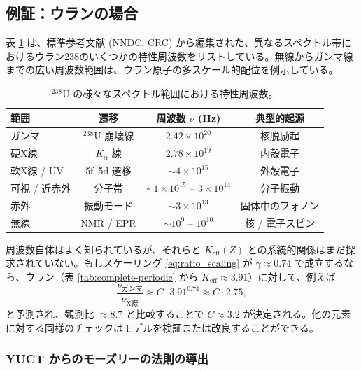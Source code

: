 \documentclass[11pt,a4paper]{article}
\begin{document}
	\subsection{例証：ウランの場合}
	
	表 \ref{tab:uranium_spectrum} は、標準参考文献 (NNDC, CRC) から編集された、異なるスペクトル帯におけるウラン238のいくつかの特性周波数をリストしている。無線からガンマ線までの広い周波数範囲は、ウラン原子の多スケール的配位を例示している。
	
	\begin{table}[htbp]
		\centering
		\caption{\(^{238}\mathrm{U}\) の様々なスペクトル範囲における特性周波数。}
		\label{tab:uranium_spectrum}
		\begin{tabular}{@{}lccc@{}}
			\toprule
			\textbf{範囲} & \textbf{遷移} & \textbf{周波数 \(\nu\) (Hz)} & \textbf{典型的起源} \\
			\midrule
			ガンマ & \(^{238}\mathrm{U}\) 崩壊線 & \(2.42\times10^{20}\) & 核脱励起 \\
			硬X線 & \(K_\alpha\) 線 & \(2.78\times10^{19}\) & 内殻電子 \\
			軟X線 / UV & 5f–5d 遷移 & \(\sim 4\times10^{15}\) & 外殻電子 \\
			可視 / 近赤外 & 分子帯 & \(\sim 1\times10^{15}\) – \(3\times10^{14}\) & 分子振動 \\
			赤外 & 振動モード & \(\sim 3\times10^{13}\) & 固体中のフォノン \\
			無線 & NMR / EPR & \(\sim 10^9\) – \(10^{10}\) & 核 / 電子スピン \\
			\bottomrule
		\end{tabular}
	\end{table}
	
	周波数自体はよく知られているが、それらと \(K_{\mathrm{eff}}(Z)\) との系統的関係はまだ探求されていない。もしスケーリング \eqref{eq:ratio_scaling} が \(\gamma \approx 0.74\) で成立するなら、ウラン（表 \ref{tab:complete-periodic} から \(K_{\mathrm{eff}}\approx 3.91\)）に対して、例えば
	\[
	\frac{\nu_{\text{ガンマ}}}{\nu_{\text{X線}}} \approx C \cdot 3.91^{0.74} \approx C \cdot 2.75,
	\]
	と予測され、観測比 \(\approx 8.7\) と比較することで \(C \approx 3.2\) が決定される。他の元素に対する同様のチェックはモデルを検証または改良することができる。
	
	\subsubsection{YUCT からのモーズリーの法則の導出}
	\label{sec:moseley_derivation}
	
\end{document}
